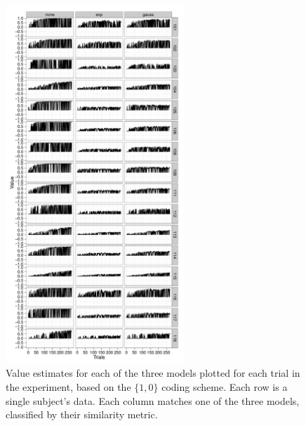 \begin{figure}[tp]
    \includegraphics[width=0.6\textwidth]{f_value_acc}
    \centering    
    \caption{Value estimates for each of the three models plotted for each trial in the experiment, based on the $\{1,0\}$ coding scheme.  Each row is a single subject's data.  Each column matches one of the three models, classified by their similarity metric.}
    \label{fig:valueacc}
\end{figure}
